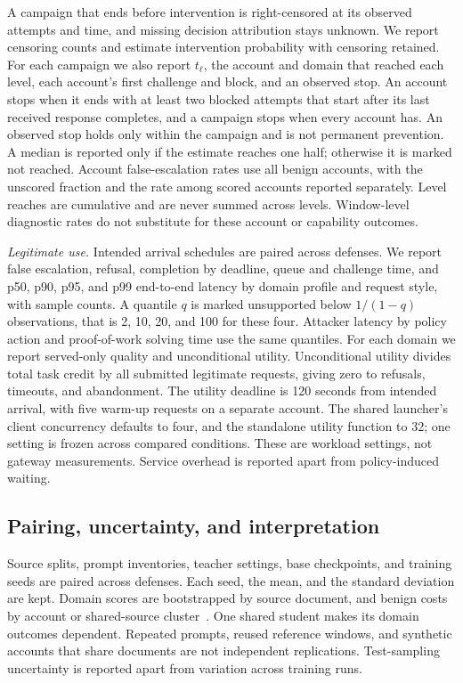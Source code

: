 \documentclass[journal]{IEEEtran}
\begin{document}
A campaign that ends before intervention is right-censored at its observed attempts and time, and missing decision attribution stays unknown. We report censoring counts and estimate intervention probability with censoring retained. For each campaign we also report $t_\ell$, the account and domain that reached each level, each account's first challenge and block, and an observed stop. An account stops when it ends with at least two blocked attempts that start after its last received response completes, and a campaign stops when every account has. An observed stop holds only within the campaign and is not permanent prevention. A median is reported only if the estimate reaches one half; otherwise it is marked not reached. Account false-escalation rates use all benign accounts, with the unscored fraction and the rate among scored accounts reported separately. Level reaches are cumulative and are never summed across levels. Window-level diagnostic rates do not substitute for these account or capability outcomes.

\textit{Legitimate use.} Intended arrival schedules are paired across defenses. We report false escalation, refusal, completion by deadline, queue and challenge time, and p50, p90, p95, and p99 end-to-end latency by domain profile and request style, with sample counts. A quantile $q$ is marked unsupported below $1/(1-q)$ observations, that is 2, 10, 20, and 100 for these four. Attacker latency by policy action and proof-of-work solving time use the same quantiles. For each domain we report served-only quality and unconditional utility. Unconditional utility divides total task credit by all submitted legitimate requests, giving zero to refusals, timeouts, and abandonment. The utility deadline is 120 seconds from intended arrival, with five warm-up requests on a separate account. The shared launcher's client concurrency defaults to four, and the standalone utility function to 32; one setting is frozen across compared conditions. These are workload settings, not gateway measurements. Service overhead is reported apart from policy-induced waiting.

\subsection{Pairing, uncertainty, and interpretation}
\label{sec:analysis}
Source splits, prompt inventories, teacher settings, base checkpoints, and training seeds are paired across defenses. Each seed, the mean, and the standard deviation are kept. Domain scores are bootstrapped by source document, and benign costs by account or shared-source cluster~\cite{field2007clustered}. One shared student makes its domain outcomes dependent. Repeated prompts, reused reference windows, and synthetic accounts that share documents are not independent replications. Test-sampling uncertainty is reported apart from variation across training runs.
\end{document}
